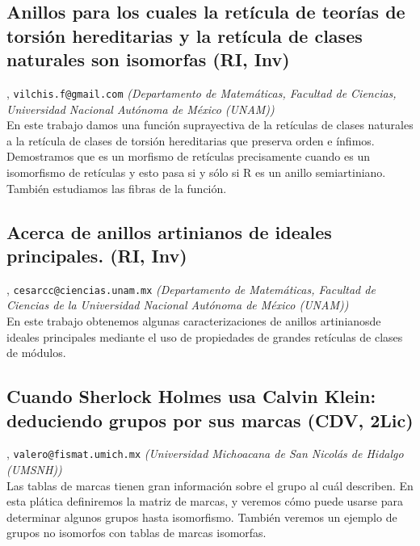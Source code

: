 \subsection{\sffamily Anillos para los  cuales la ret\'icula de teor\'ias de torsi\'on hereditarias y la ret\'icula de clases naturales son isomorfas {\footnotesize (RI, Inv)}} \label{reg-283} 
, {\tt vilchis.f@gmail.com}  {\slshape (Departamento de Matem\'aticas, Facultad de Ciencias, Universidad Nacional Aut\'onoma de M\'exico (UNAM))}\\
          \noindent En este trabajo damos una funci\'on suprayectiva de la ret\'iculas de clases naturales a la ret\'icula de clases de torsi\'on hereditarias que preserva orden e \'infimos. Demostramos que es un morfismo de ret\'iculas precisamente cuando es un isomorfismo de ret\'iculas y esto pasa si y s\'olo si R es un anillo semiartiniano. Tambi\'en estudiamos las fibras de la funci\'on.
\subsection{\sffamily Acerca de anillos artinianos de ideales principales. {\footnotesize (RI, Inv)}} \label{reg-285} 
, {\tt cesarcc@ciencias.unam.mx}  {\slshape (Departamento de Matem\'aticas, Facultad de Ciencias de la Universidad Nacional Aut\'onoma de M\'exico (UNAM))}\\
          \noindent En este trabajo obtenemos algunas caracterizaciones de anillos artinianosde ideales principales mediante el uso de propiedades de grandes ret\'iculas de clases de m\'odulos.
\subsection{\sffamily Cuando Sherlock Holmes usa Calvin Klein: deduciendo grupos por sus marcas {\footnotesize (CDV, 2Lic)}} \label{reg-346} 
, {\tt valero@fismat.umich.mx}  {\slshape (Universidad Michoacana de San Nicol\'as de Hidalgo (UMSNH))}\\
          \noindent Las tablas de marcas tienen gran informaci\'on sobre el grupo al cu\'al describen. En esta pl\'atica definiremos la matriz de marcas, y veremos c\'omo puede usarse para determinar algunos grupos hasta isomorfismo. Tambi\'en veremos un ejemplo de grupos no isomorfos con tablas de marcas isomorfas.
